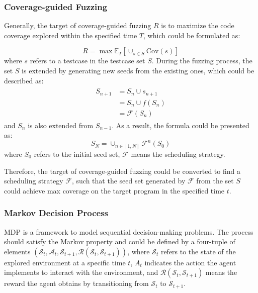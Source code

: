 \documentclass[lettersize,journal]{IEEEtran}
\begin{document}
\subsubsection{Coverage-guided Fuzzing}

Generally, the target of coverage-guided fuzzing $R$ is to maximize the code coverage explored within the specified time $T$, which could be formulated as:

\begin{equation}
	R = \max \mathbb{E}_{T}\left[\cup_{s\in S}\text{Cov}(s)\right]\label{eq:cgf_target}
\end{equation}
where $s$ refers to a testcase in the testcase set $S$. During the fuzzing process, the set $S$ is extended by generating new seeds from the existing ones, which could be described as:
\begin{align}
	\begin{split}
		S_{n+1} &= S_{n}\cup s_{n+1} \\
		&= S_n\cup f(S_{n}) \\
		&= \mathcal{F}(S_n)
	\end{split}
\end{align}
and $S_n$ is also extended from $S_{n-1}$. As a result, the formula could be presented as:
\begin{equation}
	S_{N} = \cup_{n\in[1, N]}\mathcal{F}^n(S_0)
\end{equation}
where $S_0$ refers to the initial seed set, $\mathcal{F}$ means the scheduling strategy.

Therefore, the target of coverage-guided fuzzing could be converted to find a scheduling strategy $\mathcal{F}$, such that the seed set generated by $\mathcal{F}$ from the set $S$ could achieve max coverage on the target program in the specified time $t$.

\subsubsection{Markov Decision Process}\label{subsubsec:markov_decision_process}
MDP is a framework to model sequential decision-making problems. The process should satisfy the Markov property and could be defined by a four-tuple of elements $\left(\mathcal{S}_{t}, \mathcal{A}_{t}, \mathcal{S}_{t+1}, \mathcal{R}(\mathcal{S}_{t}, \mathcal{S}_{t+1})\right)$, where $\mathcal{S}_t$ refers to the state of the explored environment at a specific time $t$, $A_t$ indicates the action the agent implements to interact with the environment, and $\mathcal{R}(\mathcal{S}_{t}, \mathcal{S}_{t+1})$ means the reward the agent obtains by transitioning from $\mathcal{S}_t$ to $\mathcal{S}_{t+1}$.
\end{document}
